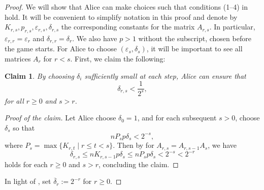 \documentclass[11pt, letterpaper]{amsart}
\theoremstyle{plain}
\newtheorem{claim}[theorem]{Claim}
\theoremstyle{definition}
\renewcommand{\epsilon}{\varepsilon}
\newcommand{\eps}{\epsilon}
\newcommand{\ov}[1]{\overline{#1}}
\begin{document}
\begin{proof}
    We will show that Alice can make choices such that conditions
    (1--4) in  hold. It will be convenient to simplify notation in this
    proof and denote by $K_{r,s},p_{r,s},\eps_{r,s},\delta_{r,s}$ the corresponding
    constants for the matrix $A_{r,s}$. In particular,
    $\epsilon_{r,r}=\epsilon_r$ and $\delta_{r,r}=\delta_r$.
    We also
    have $p>1$ without the subscript, chosen before the game starts.
  For Alice to choose $(\eps_s,\delta_s)$, it will be important to see all
  matrices $A_r$ for $r<s$. First, we claim the following:

  \begin{claim} \label{claim:smalldelta}
    By choosing $\delta_i$ sufficiently
    small at each step, Alice can ensure that 
    \[
      \delta_{r,s} < \frac{1}{2^s},
    \]
    for all $r\geq 0$ and $s > r$.
  \end{claim}

  \begin{proof}[Proof of the claim]
      \renewcommand{\qedsymbol}{$\triangle$}
      Let Alice choose $\delta_0 = 1$, and for each subsequent $s > 0$, choose $\delta_s$ so that \[nP_sp\delta_s < 2^{-s},\] where $P_s = \max\{K_{r, t} \mid r \le t < s \}$.
      Then by  for $A_{r,s} = A_{r,s-1}A_s$, we have
      \[
        \delta_{r, s} \le nK_{r, s-1}p\delta_s \leq nP_sp\delta_s < 2^{-s} <
      2^{-r}
    \]
    holds for each $r \ge 0$ and $s>r$, concluding the claim.
  \end{proof}
In light of , set $\ov{\delta}_r:= 2^{-r}$ for $r \ge 0$.
  

\end{proof}
\end{document}

